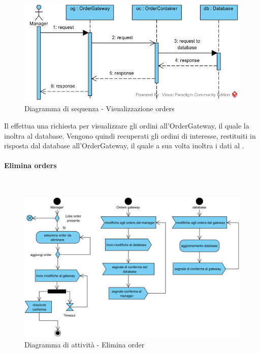 \begin{figure}[H]
	\centering
	\includegraphics[width=14cm]{../../documenti/SpecificaTecnica/diagrammi_img/sequenza/direttore_visualizza_orders.png}
	\caption{Diagramma di sequenza - Visualizzazione orders}
\end{figure}
Il \Manager{} effettua una richiesta per visualizzare gli ordini all'Order\-Gateway, il quale la inoltra al database. Vengono quindi recuperati gli ordini di interesse, restituiti in risposta dal database all'Order\-Gateway, il quale a sua volta inoltra i dati al \Manager{}.

\paragraph{Elimina orders}\mbox{}\\
\nopagebreak
\begin{figure}[H]
	\centering
	\includegraphics[width=14cm]{diagrammi_img/attivita/manager_order_remove.png}
	\caption{Diagramma di attività - Elimina order}
\end{figure}

